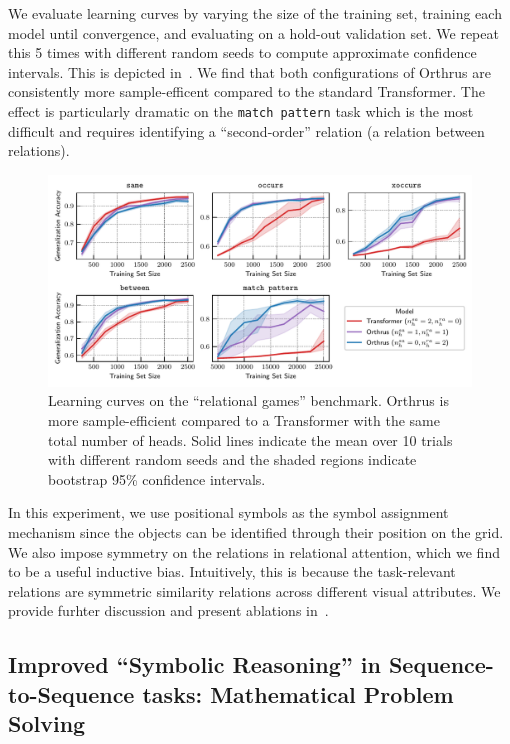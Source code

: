 We evaluate learning curves by varying the size of the training set, training each model until convergence, and evaluating on a hold-out validation set. We repeat this 5 times with different random seeds to compute approximate confidence intervals. This is depicted in~. We find that both configurations of Orthrus are consistently more sample-efficent compared to the standard Transformer. The effect is particularly dramatic on the \texttt{match pattern} task which is the most difficult and requires identifying a ``second-order'' relation (a relation between relations).

\begin{figure}
    \includegraphics[width=\textwidth]{figs/experiments/relgames/relgames_learning_curves.pdf}
    \caption{Learning curves on the ``relational games'' benchmark. Orthrus is more sample-efficient compared to a Transformer with the same total number of heads. Solid lines indicate the mean over 10 trials with different random seeds and the shaded regions indicate bootstrap 95\% confidence intervals.}\label{fig:relgames_learning_curves}
\end{figure}

In this experiment, we use positional symbols as the symbol assignment mechanism since the objects can be identified through their position on the grid. We also impose symmetry on the relations in relational attention, which we find to be a useful inductive bias. Intuitively, this is because the task-relevant relations are symmetric similarity relations across different visual attributes. We provide furhter discussion and present ablations in~.


\subsection{Improved ``Symbolic Reasoning'' in Sequence-to-Sequence tasks: Mathematical Problem Solving}\label{ssec:math}

